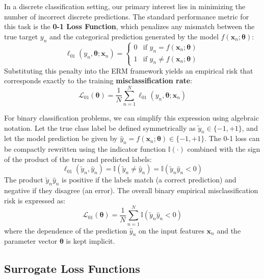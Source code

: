 \documentclass{article}
\begin{document}
In a discrete classification setting, our primary interest lies in minimizing the number of incorrect discrete predictions. The standard performance metric for this task is the \textbf{0-1 Loss Function}, which penalizes any mismatch between the true target $y_n$ and the categorical prediction generated by the model $f(\mathbf{x}_n; \boldsymbol{\theta})$:
\begin{equation}
\ell_{01}(y_n, \boldsymbol{\theta}; \mathbf{x}_n) = 
\begin{cases} 
0 & \text{if } y_n = f(\mathbf{x}_n; \boldsymbol{\theta}) \\ 
1 & \text{if } y_n \neq f(\mathbf{x}_n; \boldsymbol{\theta}) 
\end{cases}
\end{equation}
Substituting this penalty into the ERM framework yields an empirical risk that corresponds exactly to the training \textbf{misclassification rate}:
\begin{equation}
\mathcal{L}_{01}(\boldsymbol{\theta}) = \frac{1}{N} \sum_{n=1}^N \ell_{01}(y_n, \boldsymbol{\theta}; \mathbf{x}_n)
\end{equation}

For binary classification problems, we can simplify this expression using algebraic notation. Let the true class label be defined symmetrically as $\tilde{y}_n \in \{-1, +1\}$, and let the model prediction be given by $\hat{y}_n = f(\mathbf{x}_n; \boldsymbol{\theta}) \in \{-1, +1\}$. The 0-1 loss can be compactly rewritten using the indicator function $\mathbb{I}(\cdot)$ combined with the sign of the product of the true and predicted labels:
\begin{equation}
\ell_{01}(\tilde{y}_n, \hat{y}_n) = \mathbb{I}(\tilde{y}_n \neq \hat{y}_n) = \mathbb{I}(\tilde{y}_n \hat{y}_n < 0)
\end{equation}
The product $\tilde{y}_n \hat{y}_n$ is positive if the labels match (a correct prediction) and negative if they disagree (an error). The overall binary empirical misclassification risk is expressed as:
\begin{equation}
\mathcal{L}_{01}(\boldsymbol{\theta}) = \frac{1}{N} \sum_{n=1}^N \mathbb{I}(\tilde{y}_n \hat{y}_n < 0)
\end{equation}
where the dependence of the prediction $\hat{y}_n$ on the input features $\mathbf{x}_n$ and the parameter vector $\boldsymbol{\theta}$ is kept implicit.

\subsection{Surrogate Loss Functions}
\end{document}
